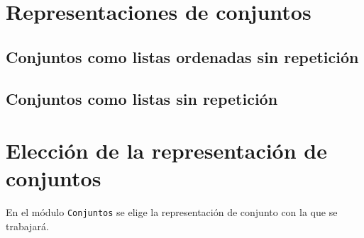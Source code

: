 \section{Representaciones de conjuntos}

\label{sec:rep_conjuntos}

\subsection{Conjuntos como listas ordenadas sin repetición}


\subsection{Conjuntos como listas sin repetición}


\section{Elección de la representación de conjuntos}

\begin{nota}
En el módulo \texttt{Conjuntos} se elige la representación de conjunto con la
que se trabajará.
\end{nota}

